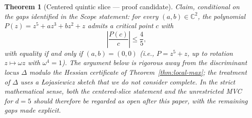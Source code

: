 \documentclass[11pt,a4paper]{article}
\newtheorem{theorem}{Theorem}[section]
\begin{document}
\begin{theorem}[Centered quintic slice --- proof candidate]\label{thm:main}
\emph{Claim, conditional on the gaps identified in the Scope statement:} for every $(a, b) \in \mathbb{C}^2$, the polynomial $P(z) = z^5 + a z^3 + b z^2 + z$ admits a critical point $c$ with
\begin{equation}
\left|\frac{P(c)}{c}\right| \le \frac{4}{5},
\end{equation}
with equality if and only if $(a, b) = (0, 0)$ (i.e., $P = z^5 + z$, up to rotation $z \mapsto \omega z$ with $\omega^4 = 1$). The argument below is rigorous away from the discriminant locus $\Delta$ modulo the Hessian certificate of Theorem~\ref{thm:local-max}; the treatment of $\Delta$ uses a \L{}ojasiewicz sketch that we do not consider complete. In the strict mathematical sense, both the centered-slice statement and the unrestricted MVC for $d = 5$ should therefore be regarded as \emph{open after this paper}, with the remaining gaps made explicit.
\end{theorem}
\end{document}

